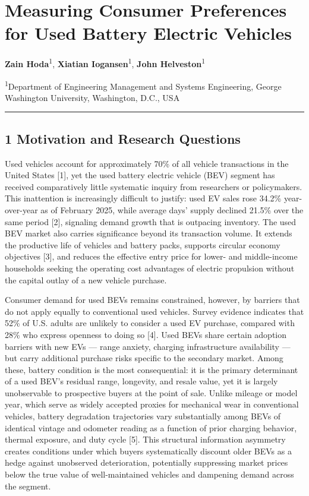 \documentclass[
  letterpaper,
  DIV=11,
  numbers=noendperiod]{scrartcl}
\author{}
\date{}
\begin{document}
\section{Measuring Consumer Preferences for Used Battery Electric
Vehicles}\label{measuring-consumer-preferences-for-used-battery-electric-vehicles}

\textbf{Zain Hoda}\textsuperscript{1}, \textbf{Xiatian
Iogansen}\textsuperscript{1}, \textbf{John Helveston}\textsuperscript{1}

\textsuperscript{1}Department of Engineering Management and Systems
Engineering, George Washington University, Washington, D.C., USA

\begin{center}\rule{0.5\linewidth}{0.5pt}\end{center}

\subsection{1 Motivation and Research
Questions}\label{motivation-and-research-questions}

Used vehicles account for approximately 70\% of all vehicle transactions
in the United States {[}1{]}, yet the used battery electric vehicle
(BEV) segment has received comparatively little systematic inquiry from
researchers or policymakers. This inattention is increasingly difficult
to justify: used EV sales rose 34.2\% year-over-year as of February
2025, while average days' supply declined 21.5\% over the same period
{[}2{]}, signaling demand growth that is outpacing inventory. The used
BEV market also carries significance beyond its transaction volume. It
extends the productive life of vehicles and battery packs, supports
circular economy objectives {[}3{]}, and reduces the effective entry
price for lower- and middle-income households seeking the operating cost
advantages of electric propulsion without the capital outlay of a new
vehicle purchase.

Consumer demand for used BEVs remains constrained, however, by barriers
that do not apply equally to conventional used vehicles. Survey evidence
indicates that 52\% of U.S. adults are unlikely to consider a used EV
purchase, compared with 28\% who express openness to doing so {[}4{]}.
Used BEVs share certain adoption barriers with new EVs --- range
anxiety, charging infrastructure availability --- but carry additional
purchase risks specific to the secondary market. Among these, battery
condition is the most consequential: it is the primary determinant of a
used BEV's residual range, longevity, and resale value, yet it is
largely unobservable to prospective buyers at the point of sale. Unlike
mileage or model year, which serve as widely accepted proxies for
mechanical wear in conventional vehicles, battery degradation
trajectories vary substantially among BEVs of identical vintage and
odometer reading as a function of prior charging behavior, thermal
exposure, and duty cycle {[}5{]}. This structural information asymmetry
creates conditions under which buyers systematically discount older BEVs
as a hedge against unobserved deterioration, potentially suppressing
market prices below the true value of well-maintained vehicles and
dampening demand across the segment.
\end{document}
